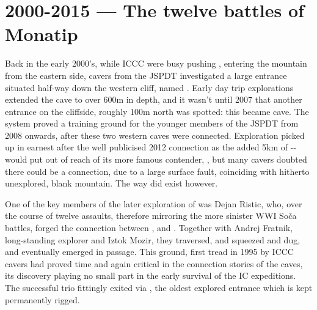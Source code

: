 \section{2000-2015 --- The twelve battles of Monatip}
Back in the early 2000’s, while ICCC were busy pushing , entering the mountain from the eastern side, cavers from the JSPDT investigated a large entrance situated half-way down the western cliff, named . Early day trip explorations extended the cave to over 600m in depth, and it wasn’t until 2007 that another entrance  on the cliffside, roughly 100m north was spotted: this became  cave. The system proved a training ground for the younger members of the JSPDT from 2008 onwards, after these two western caves were connected. Exploration picked up in earnest after the well publicised 2012 connection as the added 5km of -- would put  out of reach of its more famous contender, , but many cavers doubted there could be a connection, due to a large surface fault, coinciding with hitherto unexplored, blank mountain. The way did exist however.

One of the key members of the later exploration of  was Dejan Ristic, who, over the course of twelve assaults, therefore mirroring the more sinister WWI Soča battles, forged the connection between , and . Together with Andrej Fratnik, long-standing  explorer and Iztok Mozir, they traversed, and squeezed and dug, and eventually emerged in  passage. This ground, first tread in 1995 by ICCC cavers had proved time and again critical in the connection stories of the  caves, its discovery playing no small part in the early survival of the IC expeditions. The successful trio fittingly exited via , the oldest explored entrance which is kept permanently rigged.

